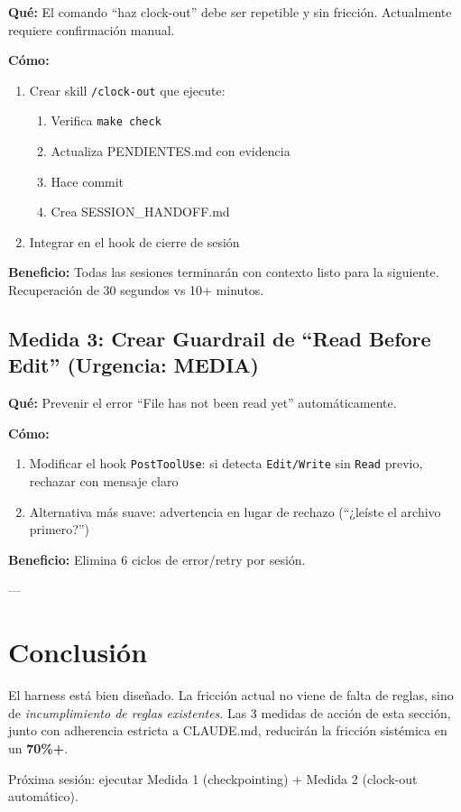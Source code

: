 \documentclass[12pt,a4paper,spanish]{article}
\begin{document}
\textbf{Qué:} El comando ``haz clock-out'' debe ser repetible y sin fricción. Actualmente requiere confirmación manual.

\textbf{Cómo:}
\begin{enumerate}
  \item Crear skill \texttt{/clock-out} que ejecute:
    \begin{enumerate}
      \item Verifica \texttt{make check}
      \item Actualiza PENDIENTES.md con evidencia
      \item Hace commit
      \item Crea SESSION\_HANDOFF.md
    \end{enumerate}
  \item Integrar en el hook de cierre de sesión
\end{enumerate}

\textbf{Beneficio:} Todas las sesiones terminarán con contexto listo para la siguiente. Recuperación de 30 segundos vs 10+ minutos.

\subsection{Medida 3: Crear Guardrail de ``Read Before Edit'' (Urgencia: MEDIA)}

\textbf{Qué:} Prevenir el error ``File has not been read yet'' automáticamente.

\textbf{Cómo:}
\begin{enumerate}
  \item Modificar el hook \texttt{PostToolUse}: si detecta \texttt{Edit/Write} sin \texttt{Read} previo, rechazar con mensaje claro
  \item Alternativa más suave: advertencia en lugar de rechazo (``¿leíste el archivo primero?'')
\end{enumerate}

\textbf{Beneficio:} Elimina 6 ciclos de error/retry por sesión.

---

\section*{Conclusión}

El harness está bien diseñado. La fricción actual no viene de falta de reglas, sino de \emph{incumplimiento de reglas existentes}. Las 3 medidas de acción de esta sección, junto con adherencia estricta a CLAUDE.md, reducirán la fricción sistémica en un \textbf{70\%+}.

Próxima sesión: ejecutar Medida 1 (checkpointing) + Medida 2 (clock-out automático).
\end{document}
